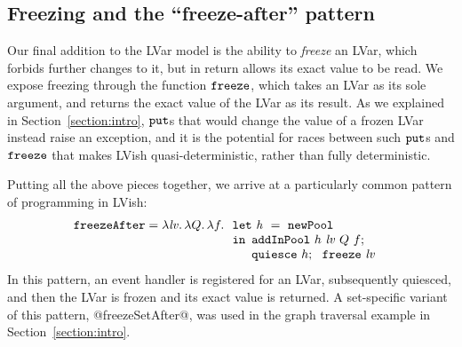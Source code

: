 \subsection{Freezing and the ``freeze-after'' pattern}\label{subsection:freeze-after}

Our final addition to the LVar model is the ability to \emph{freeze} an LVar,
which forbids further changes to it, but in return allows its exact value to be
read.  We expose freezing through the function $\mbox{\texttt{freeze}}$, which takes an LVar as
its sole argument, and returns the exact value of the LVar as its result.  As we
explained in Section~\ref{section:intro}, $\mbox{\texttt{put}}$s that would change the value of a frozen
LVar instead raise an exception, and it is the potential for races between
such $\mbox{\texttt{put}}$s and $\mbox{\texttt{freeze}}$ that makes LVish quasi-deterministic, rather than
fully deterministic.

Putting all the above pieces together, we arrive at a particularly common
pattern of programming in LVish:
\[
\begin{array}[t]{l}
  \mbox{\texttt{freezeAfter}} = \lambda\mathit{lv}.\,\lambda Q.\,\lambda f.\,
  \begin{array}[t]{l}
    \mbox{\texttt{let}}~\mathit{h}~=~{\mbox{\texttt{newPool}}} \\
    \mbox{\texttt{in}}
      \begin{array}[t]{l}  
        {\mbox{\texttt{addInPool}}}~h~\mathit{lv}~Q~f; 
\\
        {\mbox{\texttt{quiesce}}}~h;~~
        \mbox{\texttt{freeze}}~\mathit{lv}
      \end{array}
  \end{array}
\end{array}
\]
In this pattern, an event handler is registered for an LVar, subsequently
quiesced, and then the LVar is frozen and its exact value is returned.  A
set-specific variant of this pattern, @freezeSetAfter@, was used in the
graph traversal example in Section~\ref{section:intro}.
